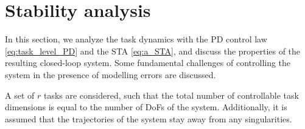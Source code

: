 \documentclass[../main.tex]{subfiles}
\begin{document}
\section{Stability analysis}
\label{sec:stability analysis}
In this section, we analyze the task dynamics with the PD control law \eqref{eq:task_level_PD} and the STA \eqref{eq:a_STA}, and discuss the properties of the resulting closed-loop system. Some fundamental challenges of controlling the system in the presence of modelling errors are discussed.
\begin{assumption}
    A set of $r$ tasks are considered, such that the total number of controllable task dimensions is equal to the number of DoFs of the system. Additionally, it is assumed that the trajectories of the system stay away from any singularities.
\end{assumption}
\end{document}
